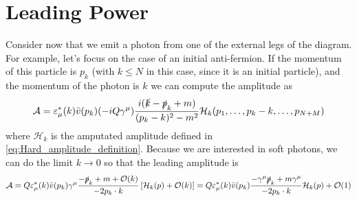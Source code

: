\documentclass{article}
\newcommand{\s}[1]{\slashed #1}
\begin{document}
\section{Leading Power}
\begin{center}
\end{center}
Consider now that we emit a photon from one of the external legs of the diagram.
For example, let's focus on the case of an initial anti-fermion.
If the momentum of this particle is $p_k$
(with $k\leq N$ in this case, since it is an initial particle),
and the momentum of the photon is $k$ we can compute the amplitude as
\begin{equation}\label{Amplitude}
	\mathcal{A}
	= \varepsilon^*_\mu(k) \bar{v}(p_k) (-iQ \gamma^\mu)
	\frac{i(\s{k} - \s{p}_k + m)}{(p_k - k)^2 - m^2}
	\mathcal{H}_k(p_1, \ldots, p_k-k, \ldots, p_{N+M})
\end{equation}
where $\mathcal{H}_k$ is the amputated amplitude defined in
\eqref{eq:Hard_amplitude_definition}.
Because we are interested in soft photons,
we can do the limit $k\to 0$ so that the leading amplitude is
\begin{equation}
	\mathcal{A}
	= Q \varepsilon^*_\mu(k) \bar{v}(p_k) \gamma^\mu
	\frac{-\s{p}_k + m + \order{k}}{-2p_k \cdot k}
	\left[\mathcal{H}_k(p) + \order{k}\right]
	= Q \varepsilon^*_\mu(k) \bar{v}(p_k)
	\frac{-\gamma^\mu\s{p}_k + m\gamma^\mu}{-2p_k \cdot k} \mathcal{H}_k(p)
	+ \order{1}
\end{equation}
\end{document}
